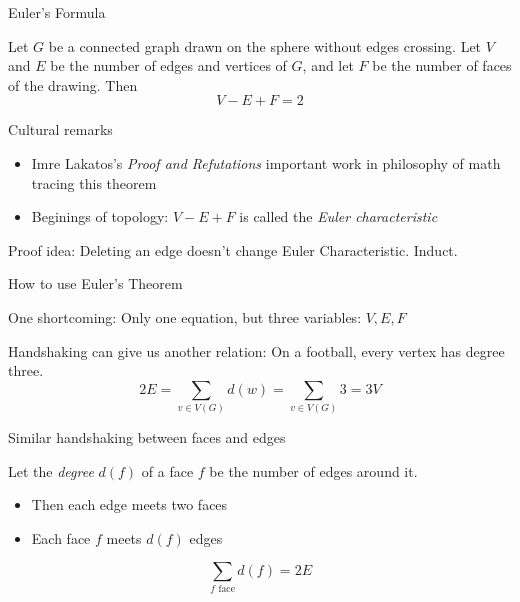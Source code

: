 \documentclass{beamer}
\begin{document}
\begin{frame}{Euler's Formula}
  \begin{theorem}
    Let $G$ be a connected graph drawn on the sphere without edges crossing.  Let $V$ and $E$ be the number of edges and vertices of $G$, and let $F$ be the number of faces of the drawing.  Then
    $$V-E+F=2$$
    \end{theorem}

  \begin{block}{Cultural remarks}
    \begin{itemize}
    \item Imre Lakatos's \emph{Proof and Refutations} important work in philosophy of math tracing this theorem
    \item Beginings of topology: $V-E+F$ is called the \emph{Euler characteristic}
      \end{itemize}
    \end{block}
  \begin{block}{Proof idea:}
    Deleting an edge doesn't change Euler Characteristic. Induct.
\end{block}  
  \end{frame}
\begin{frame}{How to use Euler's Theorem}
  \begin{block}{One shortcoming:}
    Only one equation, but three variables: $V,E,F$
    \end{block}

  \begin{block}{Handshaking can give us another relation:}
    On a football, every vertex has degree three.
    $$2E=\sum_{v\in V(G)} d(w)=\sum_{v\in V(G)} 3=3V$$
  \end{block}

  \begin{block}{Similar handshaking between faces and edges}

    Let the \emph{degree} $d(f)$ of a face $f$ be the number of edges around it.
    \begin{itemize}
\item    Then each edge meets two faces 
\item    Each face $f$ meets $d(f)$ edges 
    \end{itemize}
    $$\sum_{f \text{ face}} d(f)=2E$$
\end{block}
    
  

  \end{frame}
\end{document}
